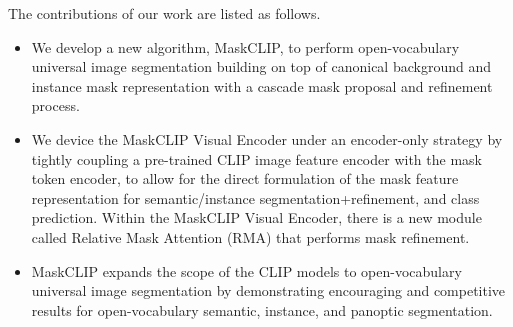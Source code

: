 \documentclass{article}
\theoremstyle{plain}
\theoremstyle{definition}
\theoremstyle{remark}
\begin{document}
The contributions of our work are listed as follows.
\begin{itemize}[leftmargin=0.5cm]
    \vspace{-2mm}
     \item We develop a new algorithm, MaskCLIP, to perform open-vocabulary universal image segmentation building on top of canonical background and instance mask representation with a cascade mask proposal and refinement process.
    \item We device the MaskCLIP Visual Encoder under an encoder-only strategy by tightly coupling a pre-trained CLIP image feature encoder with the mask token encoder, to allow for the direct formulation of the mask feature representation for semantic/instance segmentation+refinement, and class prediction. Within the MaskCLIP Visual Encoder, there is a new module called Relative Mask Attention (RMA) that performs mask refinement. 
   
    \item  MaskCLIP expands the scope of the CLIP models to open-vocabulary universal image segmentation by demonstrating encouraging and competitive results for open-vocabulary semantic, instance, and panoptic segmentation.
\end{itemize}
\end{document}
